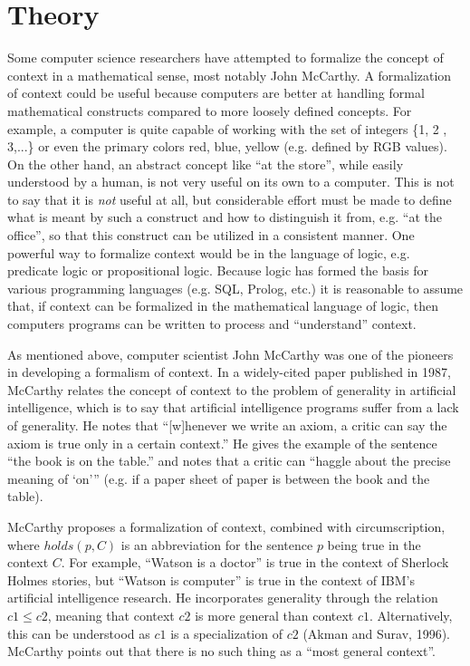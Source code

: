 \section{Theory}
\label{sec:theory}

Some computer science researchers have attempted to formalize the concept of context in a mathematical sense, most notably John McCarthy. A formalization of context could be useful because computers are better at handling formal mathematical constructs compared to more loosely defined concepts. For example, a computer is quite capable of working with the set of integers \{1, 2 , 3,...\} or even the primary colors {red, blue, yellow} (e.g. defined by RGB values). On the other hand, an abstract concept like ``at the store'', while easily understood by a human, is not very useful on its own to a computer. This is not to say that it is \emph{not} useful at all, but considerable effort must be made to define what is meant by such a construct and how to distinguish it from, e.g. ``at the office'', so that this construct can be utilized in a consistent manner. One powerful way to formalize context would be in the language of logic, e.g. predicate logic or propositional logic. Because logic has formed the basis for various programming languages (e.g. SQL, Prolog, etc.) it is reasonable to assume that, if context can be formalized in the mathematical language of logic, then computers programs can be written to process and ``understand'' context.

As mentioned above, computer scientist John McCarthy was one of the pioneers in developing a formalism of context. In a widely-cited paper published in 1987, McCarthy relates the concept of context to the problem of generality in artificial intelligence, which is to say that artificial intelligence programs suffer from a lack of generality. He notes that ``[w]henever we write an axiom, a critic can say the axiom is true only in a certain context.'' He gives the example of the sentence ``the book is on the table.'' and notes that a critic can ``haggle about the precise meaning of `on'\thinspace'' (e.g. if a paper sheet of paper is between the book and the table). 

McCarthy proposes a formalization of context, combined with circumscription, where $holds(p, C)$ is an abbreviation for the sentence $p$ being true in the context $C$. For example, ``Watson is a doctor'' is true in the context of Sherlock Holmes stories, but ``Watson is computer'' is true in the context of IBM's artificial intelligence research. He incorporates generality through the relation $c1 \le c2$, meaning that context $c2$ is more general than context $c1$. Alternatively, this can be understood as $c1$ is a specialization of $c2$ (Akman and Surav, 1996). McCarthy points out that there is no such thing as a ``most general context''.

